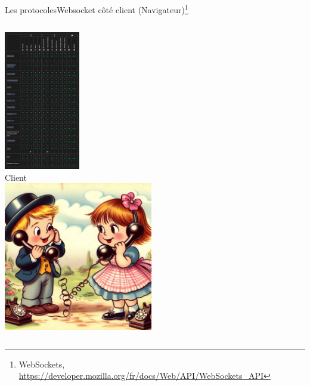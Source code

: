 \documentclass{beamer}
\begin{document}
    \begin{frame}{Les protocoles}{Websocket côté client (Navigateur)\footnote{\label{mozilla-websocket}WebSockets, \url{https://developer.mozilla.org/fr/docs/Web/API/WebSockets_API}}}
        \begin{columns}
            \centering
            \includegraphics[width=3.3cm]{image/client-support} \\ Client \\
            \centering
            \includegraphics[width=6.5cm]{image/kids-on-the-phone}
        \end{columns}
    \end{frame}
\end{document}
